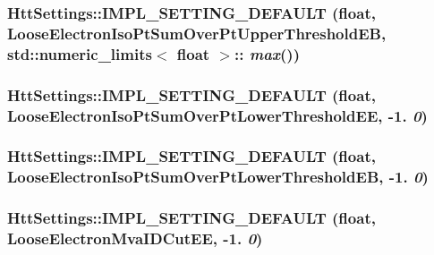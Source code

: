 \label{classHttSettings_a42aed7904ac15ac2617099a17299ec33}
\hypertarget{classHttSettings_a4f59339bd5dec544d64a5712bd410106}{
\subsubsection[{IMPL\_\-SETTING\_\-DEFAULT}]{\setlength{\rightskip}{0pt plus 5cm}HttSettings::IMPL\_\-SETTING\_\-DEFAULT (float, \/  LooseElectronIsoPtSumOverPtUpperThresholdEB, \/  std::numeric\_\-limits$<$ float $>$:: {\em max}())}}
\label{classHttSettings_a4f59339bd5dec544d64a5712bd410106}
\hypertarget{classHttSettings_a424e01a1b5a792c2b90446e03b907680}{
\subsubsection[{IMPL\_\-SETTING\_\-DEFAULT}]{\setlength{\rightskip}{0pt plus 5cm}HttSettings::IMPL\_\-SETTING\_\-DEFAULT (float, \/  LooseElectronIsoPtSumOverPtLowerThresholdEE, \/  -\/1. {\em 0})}}
\label{classHttSettings_a424e01a1b5a792c2b90446e03b907680}
\hypertarget{classHttSettings_aefec965292f899d8922671e0b5932e8f}{
\subsubsection[{IMPL\_\-SETTING\_\-DEFAULT}]{\setlength{\rightskip}{0pt plus 5cm}HttSettings::IMPL\_\-SETTING\_\-DEFAULT (float, \/  LooseElectronIsoPtSumOverPtLowerThresholdEB, \/  -\/1. {\em 0})}}
\label{classHttSettings_aefec965292f899d8922671e0b5932e8f}
\hypertarget{classHttSettings_a7472951724a2910def335470c152d36d}{
\subsubsection[{IMPL\_\-SETTING\_\-DEFAULT}]{\setlength{\rightskip}{0pt plus 5cm}HttSettings::IMPL\_\-SETTING\_\-DEFAULT (float, \/  LooseElectronMvaIDCutEE, \/  -\/1. {\em 0})}}
